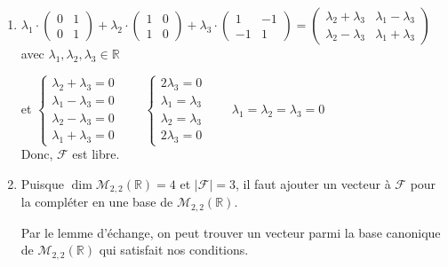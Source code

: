 \documentclass[a4paper, 10pt]{report}
\providecommand{\abs}[1]{\lvert#1\rvert}
\begin{document}
	\colorbox{solution}
	{
		\begin{minipage}{0.9\textwidth}
			\begin{enumerate}[label=\arabic*.]
				\item $\lambda_1 \cdot \begin{pmatrix}0&1\\0&1\end{pmatrix}
				+ \lambda_2 \cdot \begin{pmatrix}1&0\\1&0\end{pmatrix}
				+ \lambda_3 \cdot \begin{pmatrix}1&-1\\-1&1\end{pmatrix}
				= \begin{pmatrix}
					\lambda_2 + \lambda_3 & \lambda_1 - \lambda_3\\
					\lambda_2 - \lambda_3 & \lambda_1 + \lambda_3
				\end{pmatrix}$
				avec $\lambda_1, \lambda_2, \lambda_3 \in \mathbb{R}$
				\vspace{6pt}
				
				et
				$\left\{\begin{matrix}
					\lambda_2 + \lambda_3 = 0 \\
					\lambda_1 - \lambda_3 = 0 \\
					\lambda_2 - \lambda_3 = 0 \\
					\lambda_1 + \lambda_3 = 0
				\end{matrix}\right.
				\qquad
				\left\{\begin{matrix}
					2\lambda_3 = 0 \\
					\lambda_1 = \lambda_3 \\
					\lambda_2 = \lambda_3 \\
					2\lambda_3 = 0
				\end{matrix}\right.
				\qquad
				\lambda_1 = \lambda_2 = \lambda_3 = 0$\\
				
				Donc, $\mathcal{F}$ est libre.
				
				\vspace{12pt}
				\item Puisque $\dim \mathcal{M}_{2,2}(\mathbb{R}) = 4$
				et $\abs{\mathcal{F}} = 3$, il faut ajouter un vecteur
				à $\mathcal{F}$ pour la compléter en une base de
				$\mathcal{M}_{2,2}(\mathbb{R})$.\vspace{6pt}
				
				Par le lemme d'échange, on peut trouver un vecteur parmi
				la base canonique de $\mathcal{M}_{2,2}(\mathbb{R})$
				qui satisfait nos conditions.\vspace{6pt}
				

\end{enumerate}
\end{minipage}}
\end{document}
